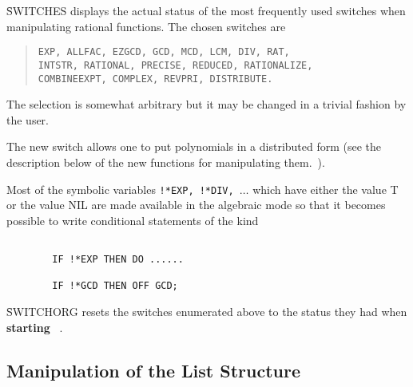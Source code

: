 \f{SWITCHES} displays the actual status of the most frequently used switches
when manipulating rational functions. The chosen switches are
\begin{quotation}
\noindent
{\tt EXP, ALLFAC, EZGCD, GCD, MCD, LCM, DIV, RAT, \\%
INTSTR, RATIONAL, PRECISE, REDUCED, RATIONALIZE, \\%
COMBINEEXPT, COMPLEX, REVPRI, DISTRIBUTE.}
\end{quotation}

The selection is somewhat arbitrary but it may be changed in a trivial
fashion by the user.

\hypertarget{switch:DISTRIBUTE}{}
The new switch  allows one to put polynomials in a
distributed form (see the description below of
the new functions for manipulating  them.~).

Most of the symbolic variables {\tt !*EXP, !*DIV, $\ldots$}
which have either the value T or the value NIL are made available in the
algebraic mode so that it becomes possible to write conditional
statements of the kind
\begin{verbatim}

        IF !*EXP THEN DO ......

        IF !*GCD THEN OFF GCD;

\end{verbatim}
\f{SWITCHORG} resets  the switches enumerated above to the status
they had when {\bf starting} \REDUCE\ .
\subsection{Manipulation of the List Structure}

